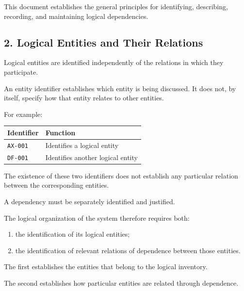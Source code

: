 This document establishes the general principles
for identifying, describing, recording, and
maintaining logical dependencies.


\subsection*{2. Logical Entities and Their Relations}

Logical entities are identified independently
of the relations in which they participate.

An entity identifier establishes which entity
is being discussed. It does not, by itself,
specify how that entity relates to other entities.

For example:

\begin{center}
\begin{tabular}{ll}
    \toprule
    \textbf{Identifier} & \textbf{Function} \\
    \midrule
    \texttt{AX-001}
        & Identifies a logical entity \\
    \texttt{DF-001}
        & Identifies another logical entity \\
    \bottomrule
\end{tabular}
\end{center}

The existence of these two identifiers does not
establish any particular relation between the
corresponding entities.

A dependency must be separately identified
and justified.

The logical organization of the system therefore
requires both:

\begin{enumerate}
    \item the identification of its logical entities;
    \item the identification of relevant relations
    of dependence between those entities.
\end{enumerate}

The first establishes the entities that belong
to the logical inventory.

The second establishes how particular entities
are related through dependence.


